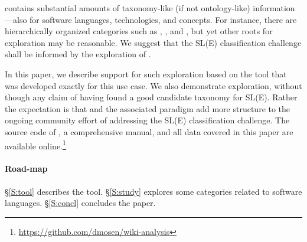 \Wikipedia{} contains substantial amounts of taxonomy-like (if not ontology-like) information---also for software languages, technologies, and concepts. For instance, there are hierarchically organized categories such as , , and , but yet other roots for exploration may be reasonable. We suggest that the SL(E) classification challenge shall be informed by the exploration of \Wikipedia. 

In this paper, we describe support for such exploration based on the \WikiTax{} tool that was developed exactly for this use case. We also demonstrate exploration, without though any claim of having found a good candidate taxonomy for SL(E). Rather the expectation is that \WikiTax{} and the associated paradigm add more structure to the ongoing community effort of addressing the SL(E) classification challenge. The source code of \WikiTax, a comprehensive manual, and all data covered in this paper are available online.\footnote{\url{https://github.com/dmosen/wiki-analysis}}

\paragraph*{Road-map} \S\ref{S:tool} describes the \WikiTax{} tool. \S\ref{S:study} explores some \Wikipedia{} categories related to software languages. \S\ref{S:concl} concludes the paper.

